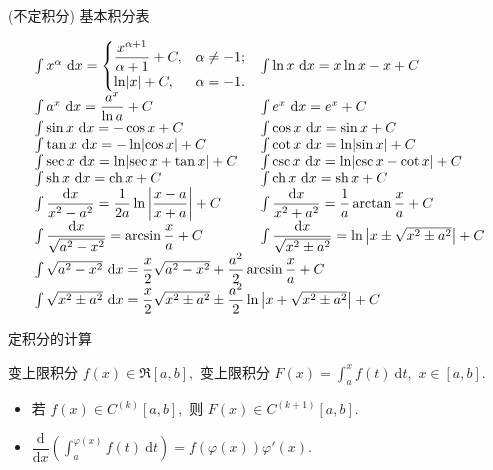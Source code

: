 \begin{frame}{(不定积分) 基本积分表}

{\smaller[2]
\[
\begin{array}{ll}
\int x^\alpha ~ \mathrm{d} x = \begin{cases}
  \dfrac{x^{\alpha+1}}{\alpha+1} + C, & \alpha \neq -1;\\
  \ln \lvert x \rvert + C, & \alpha = -1.
\end{cases} & \int \ln x ~ \mathrm{d} x = x \ln x - x + C \\
\int a^x ~ \mathrm{d} x = \dfrac{a^x}{\ln a} + C & \int e^x ~ \mathrm{d} x = e^x + C \\
\int \sin x ~ \mathrm{d} x = -\cos x + C & \int \cos x ~ \mathrm{d} x = \sin x + C \\
\int \tan x ~ \mathrm{d} x = -\ln \lvert \cos x \rvert + C & \int \cot x ~ \mathrm{d} x = \ln \lvert \sin x \rvert + C \\
\int \sec x ~ \mathrm{d} x = \ln \lvert \sec x + \tan x \rvert + C & \int \csc x ~ \mathrm{d} x = \ln \lvert \csc x - \cot x \rvert + C \\
\int \operatorname{sh} x ~ \mathrm{d} x = \operatorname{ch} x + C & \int \operatorname{ch} x ~ \mathrm{d} x = \operatorname{sh} x + C \\
\int \dfrac{\mathrm{d} x}{x^2 - a^2} = \dfrac{1}{2a} \ln \left\lvert \dfrac{x-a}{x+a} \right\rvert + C & \int \dfrac{\mathrm{d} x}{x^2+a^2} = \dfrac{1}{a} \arctan \dfrac{x}{a} + C \\
\int \dfrac{\mathrm{d} x}{\sqrt{a^2-x^2}} = \arcsin \dfrac{x}{a} + C & \int \dfrac{\mathrm{d} x}{\sqrt{x^2 \pm a^2}} = \ln \left\lvert x \pm \sqrt{x^2 \pm a^2} \right\rvert + C \\
\multicolumn{2}{l}{\int \sqrt{a^2 - x^2} ~ \mathrm{d} x = \dfrac{x}{2} \sqrt{a^2 - x^2} + \dfrac{a^2}{2} \arcsin \dfrac{x}{a} + C} \\
\multicolumn{2}{l}{\int \sqrt{x^2 \pm a^2} ~ \mathrm{d} x = \dfrac{x}{2} \sqrt{x^2 \pm a^2} \pm \dfrac{a^2}{2} \ln \left\lvert x + \sqrt{x^2 \pm a^2} \right\rvert + C}
\end{array}
\]
}

\end{frame}


\begin{frame}{定积分的计算}

\begin{block}{变上限积分}
$f(x) \in \mathfrak{R}[a, b],$ 变上限积分 $F(x) = \int_a^x f(t) ~ \mathrm{d} t,$ $x \in [a, b].$
\end{block}

\pause

\begin{itemize}[<+->]
\item 若 $f(x) \in C^{(k)}[a, b],$ 则 $F(x) \in C^{(k+1)}[a, b].$
\item $\dfrac{\mathrm{d}}{\mathrm{d} x} \left( \int_a^{\varphi(x)} f(t) ~ \mathrm{d} t \right) = f(\varphi(x)) \varphi'(x).$
\end{itemize}

\end{frame}

